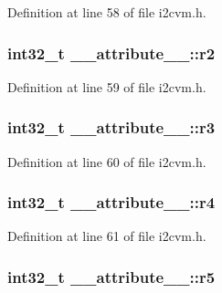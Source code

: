 \-Definition at line 58 of file i2cvm.\-h.

\hypertarget{struct____attribute_____ac9f443ec67da2191dbc6e933ff4b4a6d}{
\subsubsection[{r2}]{\setlength{\rightskip}{0pt plus 5cm}int32\-\_\-t {\bf \-\_\-\-\_\-attribute\-\_\-\-\_\-\-::r2}}}\label{struct____attribute_____ac9f443ec67da2191dbc6e933ff4b4a6d}


\-Definition at line 59 of file i2cvm.\-h.

\hypertarget{struct____attribute_____a5647d0f5d686f5c87e1c18f7f1c10991}{
\subsubsection[{r3}]{\setlength{\rightskip}{0pt plus 5cm}int32\-\_\-t {\bf \-\_\-\-\_\-attribute\-\_\-\-\_\-\-::r3}}}\label{struct____attribute_____a5647d0f5d686f5c87e1c18f7f1c10991}


\-Definition at line 60 of file i2cvm.\-h.

\hypertarget{struct____attribute_____a330a6dc80a8c1ac0987bd8f6c0881eff}{
\subsubsection[{r4}]{\setlength{\rightskip}{0pt plus 5cm}int32\-\_\-t {\bf \-\_\-\-\_\-attribute\-\_\-\-\_\-\-::r4}}}\label{struct____attribute_____a330a6dc80a8c1ac0987bd8f6c0881eff}


\-Definition at line 61 of file i2cvm.\-h.

\hypertarget{struct____attribute_____a7cec99a426cb7f046332ac4ad5896a39}{
\subsubsection[{r5}]{\setlength{\rightskip}{0pt plus 5cm}int32\-\_\-t {\bf \-\_\-\-\_\-attribute\-\_\-\-\_\-\-::r5}}}\label{struct____attribute_____a7cec99a426cb7f046332ac4ad5896a39}


